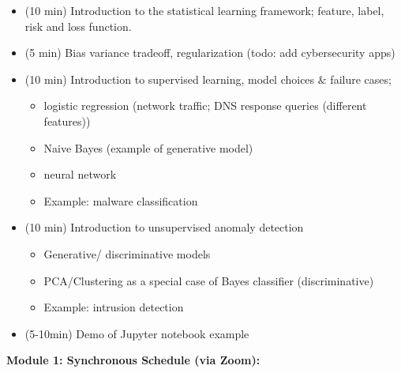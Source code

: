 \documentclass[12pt]{article}
\renewcommand{\_}{\kern-1.5pt\textunderscore\kern-1.5pt}
\begin{document}
\begin{itemize}
	\item (10 min) Introduction to the statistical learning framework; feature, label, risk and loss function.\par

	\item (5 min) Bias variance tradeoff, regularization (todo: add cybersecurity apps)\par

	\item (10 min) Introduction to supervised learning, model choices $\&$  failure cases;\par

\begin{itemize}
	\item logistic regression (network traffic; DNS response queries (different features))\par

	\item Naive Bayes (example of generative model)\par

	\item neural network\par

	\item Example: malware classification\par


\end{itemize}
	\item (10 min) Introduction to unsupervised anomaly detection\par

\begin{itemize}
	\item Generative/ discriminative models\par

	\item PCA/Clustering as a special case of Bayes classifier (discriminative)\par

	\item Example: intrusion detection\par


\end{itemize}
	\item (5-10min) Demo of Jupyter notebook example
\end{itemize}\par

\textbf{Module 1: Synchronous Schedule (via Zoom): }\par
\end{document}
